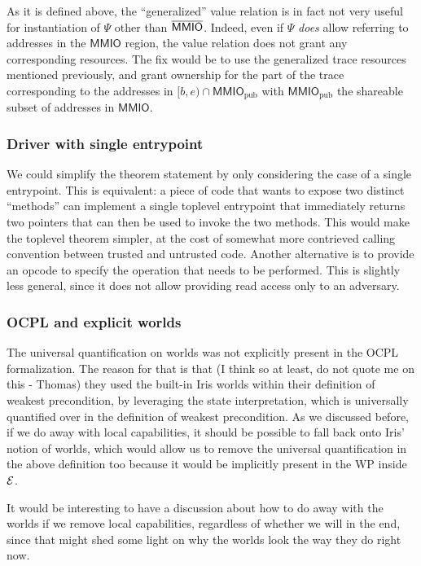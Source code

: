 \documentclass{article}
\newcommand{\X}[1]{\ensuremath{\mathrm{#1}}}
\newcommand{\Sf}[1]{\ensuremath{\mathsf{#1}}}
\newcommand{\MMIO}{\Sf{MMIO}\xspace}
\begin{document}
As it is defined above, the ``generalized'' value relation
is in fact not very useful for instantiation of $\Psi$ other than $\notMMIO$.
Indeed, even if $\Psi$ \emph{does} allow referring to addresses in the $\MMIO$
region, the value relation does not grant any corresponding resources. The fix
would be to use the generalized trace resources mentioned previously, and grant
ownership for the part of the trace corresponding to the addresses in
$[b,e) \cap \MMIO_{\X{pub}}$ with $\MMIO_{\X{pub}}$ the shareable subset of
addresses in \MMIO.

\subsubsection{Driver with single entrypoint}
\label{rk:toplevel:single_entrypoint}

We could simplify the theorem statement by only considering the case of a
single entrypoint. This is equivalent: a piece of code that wants to expose
two distinct ``methods'' can implement a single toplevel entrypoint that
immediately returns two pointers that can then be used to invoke the two
methods.
%
This would make the toplevel theorem simpler, at the cost of somewhat more
contrieved calling convention between trusted and untrusted code.
Another alternative is to provide an opcode to specify the operation that
needs to be performed.
This is slightly less general, since it does not allow providing read access
only to an adversary.

\subsubsection{OCPL and explicit worlds}
\label{rk:toplevel:ocpl_explicit_worlds}

The universal quantification on worlds was not explicitly present in the OCPL
formalization.
The reason for that is that (I think so at least, do not quote me
on this - Thomas) they
used the built-in Iris worlds within their definition of weakest precondition,
by leveraging the state interpretation, which is universally quantified over in
the definition of weakest precondition.
As we discussed before, if we do away
with local capabilities, it should be possible to fall back onto Iris' notion of
worlds, which would allow us to remove the universal quantification in the
above definition too because it would be implicitly present in the WP inside $\mathcal{E}$.

It would be interesting to have a discussion about how to do away with the
worlds if we remove local capabilities, regardless of whether we will in the
end, since that might shed some light on why the worlds look the way they do
right now.
\end{document}
